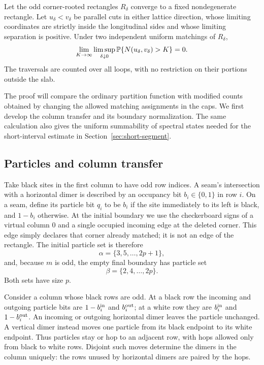 \begin{proposition}
\label{prop:rectangle-crossings}
Let the odd corner-rooted rectangles $R_\delta$ converge to a fixed
nondegenerate rectangle.  Let $u_\delta<v_\delta$ be parallel cuts in
either lattice direction, whose limiting coordinates are strictly
inside the longitudinal sides and whose limiting separation is
positive.  Under two independent uniform matchings of $R_\delta$,
\[
 \lim_{K\to\infty}\limsup_{\delta\downarrow0}
      \mathbb P\{N(u_\delta,v_\delta)>K\}=0.
\]
The traversals are counted over all loops, with no restriction on their
portions outside the slab.
\end{proposition}

The proof will compare the ordinary partition function with modified
counts obtained by changing the allowed matching assignments in the caps.
We first develop the column transfer and its boundary normalization.
The same calculation also gives the uniform summability of spectral
states needed for the short-interval estimate in
Section~\ref{sec:short-segment}.

\subsection{Particles and column transfer}

Take black sites in the first column to have odd row indices.
A seam's intersection with a horizontal dimer is described by an
occupancy bit $b_i\in\{0,1\}$ in row $i$.
On a seam, define its particle bit $q_i$ to be $b_i$ if the site immediately
to its left is black, and $1-b_i$ otherwise.  At the initial boundary we
use the checkerboard signs of a virtual column $0$ and a single occupied
incoming edge at the deleted corner.  This edge simply declares that
corner already matched; it is not an edge of the rectangle.  The initial
particle set is therefore
\[
 \alpha=\{3,5,\ldots,2p+1\},
\]
and, because $m$ is odd, the empty final boundary has particle set
\[
 \beta=\{2,4,\ldots,2p\}.
\]
Both sets have size $p$.

Consider a column whose black rows are odd.  At a black row the incoming
and outgoing particle bits are $1-b_i^{\rm in}$ and $b_i^{\rm out}$;
at a white row they are $b_i^{\rm in}$ and $1-b_i^{\rm out}$.
An incoming or outgoing horizontal dimer leaves the particle unchanged.
A vertical dimer instead moves one particle from its black endpoint to
its white endpoint.  Thus particles stay or hop to an adjacent row, with
hops allowed only from black to white rows.  Disjoint such moves determine
the dimers in the column uniquely: the rows unused by horizontal dimers
are paired by the hops.

